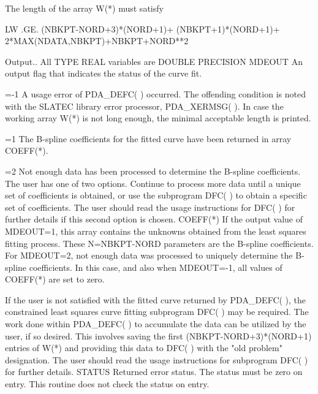 \documentclass[11pt,twoside,nolof]{starlink}
\begin{document}
\begin{terminalv}
                         The length of the array W(*) must satisfy

                         LW .GE. (NBKPT-NORD+3)*(NORD+1)+
                                 (NBKPT+1)*(NORD+1)+
                               2*MAX(NDATA,NBKPT)+NBKPT+NORD**2

  Output.. All TYPE REAL variables are DOUBLE PRECISION
      MDEOUT
                         An output flag that indicates the status
                         of the curve fit.

                         =-1  A usage error of PDA_DEFC( ) occurred.  The
                         offending condition is noted with the SLATEC
                         library error processor, PDA_XERMSG( ).  In case
                         the working array W(*) is not long enough, the
                         minimal acceptable length is printed.

                         =1  The B-spline coefficients for the fitted
                         curve have been returned in array COEFF(*).

                         =2  Not enough data has been processed to
                         determine the B-spline coefficients.
                         The user has one of two options.  Continue
                         to process more data until a unique set
                         of coefficients is obtained, or use the
                         subprogram DFC( ) to obtain a specific
                         set of coefficients.  The user should read
                         the usage instructions for DFC( ) for further
                         details if this second option is chosen.
      COEFF(*)
                         If the output value of MDEOUT=1, this array
                         contains the unknowns obtained from the least
                         squares fitting process.  These N=NBKPT-NORD
                         parameters are the B-spline coefficients.
                         For MDEOUT=2, not enough data was processed to
                         uniquely determine the B-spline coefficients.
                         In this case, and also when MDEOUT=-1, all
                         values of COEFF(*) are set to zero.

                         If the user is not satisfied with the fitted
                         curve returned by PDA_DEFC( ), the constrained
                         least squares curve fitting subprogram DFC( )
                         may be required.  The work done within PDA_DEFC( )
                         to accumulate the data can be utilized by
                         the user, if so desired.  This involves
                         saving the first (NBKPT-NORD+3)*(NORD+1)
                         entries of W(*) and providing this data
                         to DFC( ) with the "old problem" designation.
                         The user should read the usage instructions
                         for subprogram DFC( ) for further details.
      STATUS
                         Returned error status.
                         The status must be zero on entry. This
                         routine does not check the status on entry.


\end{terminalv}
\end{document}
